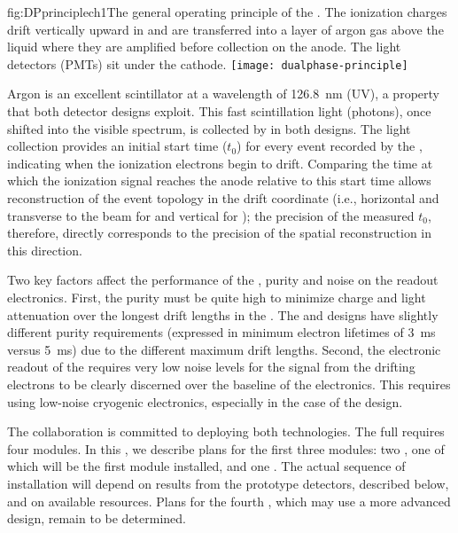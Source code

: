 \begin{dunefigure}{fig:DPprinciplech1}{The general operating principle of the  . The ionization charges drift vertically upward in  and are transferred into a layer of argon gas above the liquid where they are amplified before collection on the anode. The light detectors (PMTs) sit under the cathode.}
\texttt{[image: dualphase-principle]}
\end{dunefigure}


Argon is an excellent scintillator at a wavelength of \SI{126.8}{\nano\meter} (UV), a property that both detector designs exploit. This fast scintillation light (photons), once shifted into the visible spectrum, is collected by  in both designs. The light collection provides an initial start time ($t_{0}$) for every event recorded by the , indicating when the ionization electrons begin to drift. Comparing the time at which the ionization signal reaches the anode relative to this start time allows reconstruction of the event topology in the drift coordinate (i.e., horizontal and transverse to the beam for  and vertical for ); the precision of the measured $t_{0}$, therefore, directly corresponds to the precision of the spatial reconstruction in this direction. 

Two key factors affect the performance of the  ,  purity and noise on the readout electronics.  First, the  purity must be %
quite high to minimize charge and light attenuation over the longest drift lengths in the .  %
The  and  designs have slightly different purity requirements (expressed in minimum electron lifetimes of \SI{3}{ms} versus \SI{5}{ms}) due to the different maximum drift lengths.
%
Second, the electronic readout of the  requires very low noise levels for the signal from the drifting electrons to be clearly discerned over the baseline of the electronics.  This requires using low-noise cryogenic electronics, especially in the case of the  design.

The  collaboration is committed to deploying both technologies. The full   requires four modules. In this , we describe plans for the first three modules: two , one of which will be the first module installed, and one . %
The actual sequence of  installation will depend on results from the prototype detectors, described below, and on available resources. Plans for the fourth , which may use a more advanced design, remain to be determined. 

